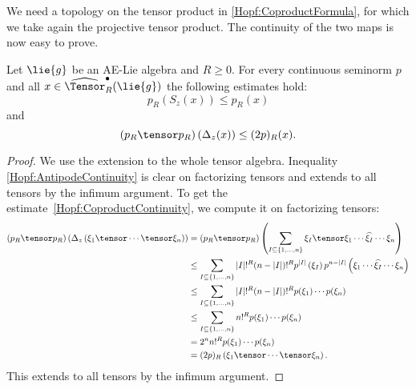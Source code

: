 We need a topology on the tensor product in \eqref{Hopf:CoproductFormula}, 
for which we take again the projective tensor product. The continuity of the 
two maps is now easy to prove.
\begin{proposition}
    \label{Prop:Hopf:CoproductContinuity}%
    Let $\lie{g}$ be an AE-Lie algebra and $R \geq 0$. For every continuous 
    seminorm $p$ and all $x \in \widehat{\Tensor}_R^\bullet(\lie{g})$
    the following estimates hold:
    \begin{equation}
        \label{Hopf:AntipodeContinuity}
        p_R \left( S_z(x) \right)
        \leq
        p_R (x)
    \end{equation}
    and
    \begin{equation}
        \label{Hopf:CoproductContinuity}
        (p_R \tensor p_R)
        \left(\ocoproduct_z(x)\right)
        \leq
        (2 p)_R (x).
    \end{equation}
\end{proposition}
\begin{proof}
	We use the extension to the whole tensor algebra. Inequality
	\eqref{Hopf:AntipodeContinuity} is clear on factorizing tensors 
	and extends to all tensors by the infimum argument. 
	To get the estimate~\eqref{Hopf:CoproductContinuity}, 
	we compute it on factorizing tensors:
	\begin{align*}
		(p_R \tensor p_R)
        \left( \ocoproduct_z
        	\left(
        		\xi_1 \tensor \cdots \tensor \xi_n
        	\right)
        \right)
        & =
		(p_R \tensor p_R)
        \left( 
			\sum\limits_{
        		I \subseteq
        		\{1, \ldots, n\}
        	}
        	\xi_I
        	\tensor
        	\xi_1 \cdots
        	\widehat{\xi_I}
        	\cdots \xi_n
        \right)
        \\
        & \leq
        \sum\limits_{
        	I \subseteq
        	\{1, \ldots, n\}
        }
        |I|!^R (n - |I|)!^R
        p^{|I|} \left( \xi_I \right)
        p^{n - |I|}
        \left( 
        	\xi_1 \cdots \widehat{\xi_I} \cdots \xi_n 
        \right)
        \\
        & \leq
        \sum\limits_{
        	I \subseteq
        	\{1, \ldots, n\}
        }
        |I|!^R (n - |I|)!^R
        p(\xi_1) \cdots p(\xi_n)
        \\
        & \leq
        \sum\limits_{
        	I \subseteq
        	\{1, \ldots, n\}
        }
        n!^R
        p(\xi_1) \cdots p(\xi_n)
        \\
        & =
        2^n n!^R
        p(\xi_1) \cdots p(\xi_n)
        \\
        & =
        (2p)_R \left(
        	\xi_1 \tensor \cdots \tensor \xi_n
        \right).
	\end{align*}
	This extends to all tensors by the infimum argument.
\end{proof}

